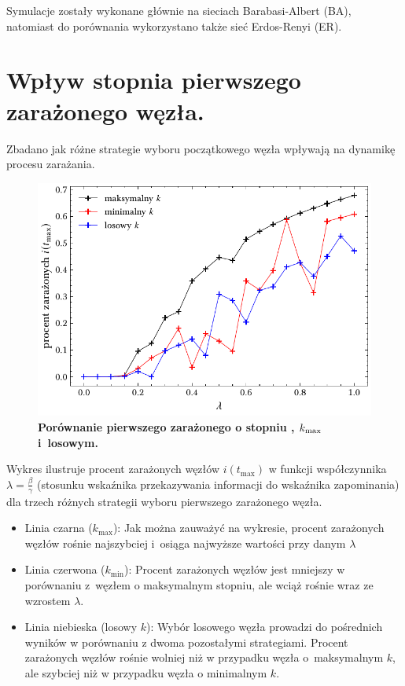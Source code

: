 \documentclass[13pt,a4paper]{article}
\begin{document}
Symulacje zostały wykonane głównie na sieciach Barabasi-Albert (BA), natomiast do porównania wykorzystano także sieć Erdos-Renyi (ER).


\section{Wpływ stopnia pierwszego zarażonego węzła.}

Zbadano jak różne strategie wyboru początkowego węzła wpływają na dynamikę procesu zarażania.

\begin{figure}[ht!]
	\centering
	\includegraphics[width=\textwidth]{../figures/none/ba_max_min_rnd.pdf}
	\caption{\textbf{Porównanie pierwszego zarażonego o stopniu , $\boldmath{k_{\max}}$ i losowym.}}
\end{figure}

Wykres ilustruje procent zarażonych węzłów $i(t_{\max})$ w funkcji współczynnika $\lambda=\frac{\beta}{\gamma}$ (stosunku wskaźnika przekazywania informacji do wskaźnika zapominania) dla trzech różnych strategii wyboru pierwszego zarażonego węzła.

\begin{itemize}
	\item Linia czarna ($k_{\max}$): Jak można zauważyć na wykresie, procent zarażonych węzłów rośnie najszybciej i osiąga najwyższe wartości przy danym $\lambda$
	\item Linia czerwona ($k_{\min}$): Procent zarażonych węzłów jest mniejszy w porównaniu z węzłem o maksymalnym stopniu, ale wciąż rośnie wraz ze wzrostem $\lambda$.
	\item Linia niebieska (losowy $k$): Wybór losowego węzła prowadzi do pośrednich wyników w porównaniu z dwoma pozostałymi strategiami. Procent zarażonych węzłów rośnie wolniej niż w przypadku węzła o maksymalnym $k$, ale szybciej niż w przypadku węzła o minimalnym $k$.
\end{itemize}
\end{document}

